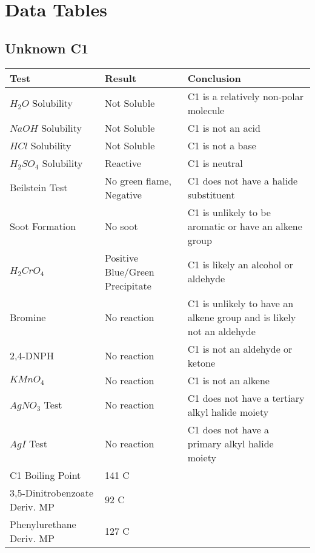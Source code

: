 \documentclass{article}
\begin{document}
	
	
	\pagebreak
	\section{Data Tables}
	\subsection{Unknown C1}
	\begin{table}[h]
		
		\begin{tabular}{ l  p{3.0cm} p{5.4cm} } 
			\toprule
			\textbf{Test} & \textbf{Result} & \textbf{Conclusion} \\\midrule
			
			$H_2O$ Solubility & Not Soluble & C1 is a relatively non-polar molecule \\\hline
			
			$NaOH$ Solubility & Not Soluble & C1 is not an acid \\\hline
			
			$HCl$ Solubility & Not Soluble & C1 is not a base  \\\hline
			
			$H_2SO_4$ Solubility & Reactive & C1 is neutral \\\hline
			
			Beilstein Test & No green flame, Negative & C1 does not have a halide substituent \\\hline
			
			Soot Formation & No soot & C1 is unlikely to be aromatic or have an alkene group \\\hline
			
			$H_2CrO_4$ & Positive Blue/Green Precipitate & C1 is likely an alcohol or aldehyde \\\hline
			
			Bromine & No reaction & C1 is unlikely to have an alkene group and is likely not an aldehyde \\\hline 
			
			2,4-DNPH & No reaction & C1 is not an aldehyde or ketone \\\hline 
			
			$KMnO_4$ & No reaction & C1 is not an alkene \\\hline  
			
			$AgNO_3$ Test & No reaction & C1 does not have a tertiary alkyl halide moiety \\\hline 
			
			$AgI$ Test & No reaction & C1 does not have a primary alkyl halide moiety \\\hline 
			
			C1 Boiling Point & 141 C &  \\\hline
			
			3,5-Dinitrobenzoate Deriv. MP & 92 C &  \\\hline 
			
			Phenylurethane Deriv. MP & 127 C &  \\\hline 
			
			
			
		\end{tabular}
	\end{table}
	\pagebreak
	
\end{document}
